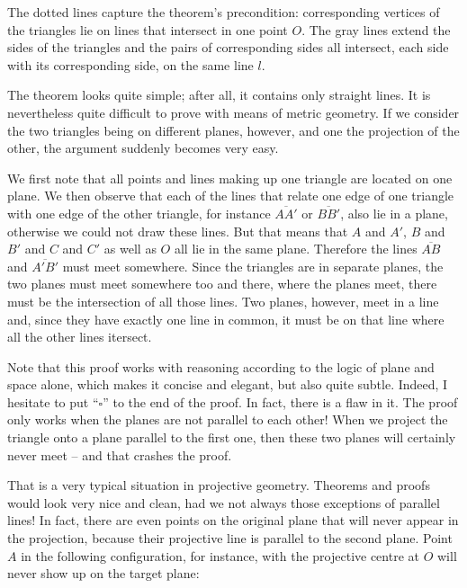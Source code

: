 \documentclass[tikz]{scrreprt}
\begin{document}
The dotted lines capture the theorem's precondition:
corresponding vertices of the triangles 
lie on lines that intersect in one point $O$.
The gray lines extend the sides of the triangles and
the pairs of corresponding sides all intersect, each side
with its corresponding side, on the same line $l$.

The theorem looks quite simple; after all, it contains
only straight lines. It is nevertheless quite difficult to prove
with means of metric geometry.
If we consider the two triangles being on different planes, however,
and one the projection of the other, the argument suddenly
becomes very easy.

We first note that all points and lines making up one triangle 
are located on one plane. We then observe 
that each of the lines that relate one edge of one triangle
with one edge of the other triangle,
for instance $\overline{AA\prime}$ or $\overline{BB\prime}$,
also lie in a plane, otherwise we could not draw these lines.
But that means that $A$ and $A\prime$, $B$ and $B\prime$ and
$C$ and $C\prime$ as well as $O$ all lie in the same plane. 
Therefore the lines $\overline{AB}$ and $\overline{A\prime B\prime}$
must meet somewhere. 
Since the triangles are in separate planes, the two planes
must meet somewhere too and there, 
where the planes meet, there must
be the intersection of all those lines. Two planes, however,
meet in a line and, since they have exactly one line in common, 
it must be on that line where all the other lines
itersect. 

Note that this proof works with reasoning according to the logic
of plane and space alone, which makes it concise and elegant,
but also quite subtle. Indeed, I hesitate to put ``$\square$'' to the
end of the proof. In fact, there is a flaw in it.
The proof only works when the planes 
are not parallel to each other!
When we project the triangle onto a plane parallel to the first one,
then these two planes will certainly never meet -- and that 
crashes the proof.

That is a very typical situation in projective geometry.
Theorems and proofs would look very nice and clean,
had we not always those exceptions of parallel lines!
In fact, there are even points on the original plane that will never appear
in the projection, because their projective line is
parallel to the second plane. Point $A$ in the following
configuration, for instance, with the projective centre at $O$
will never show up on the target plane: 
\end{document}
